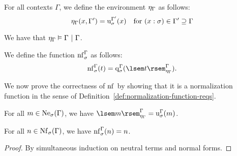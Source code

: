 \begin{comment}
Note the condition "$x$ fresh" in the second case of $\quotef$. This is obviously not a well-defined condition from a mathematical perspective. Rather, it aims to provide computational intuition: when computing the result of $\quotef$ at a function type, we generate a fresh variable name in order avoid capturing the other free variables in the term returned by the recursive call. It is not too difficult to avoid this ambiguity by slightly modifying the interpretation, allowing us to control which variables may occur free in terms.
\end{comment}


\begin{defn} \label{def:idenv}
For all contexts $\Gamma$, we define the environment $\eta_{\Gamma}$ as follows:
\[ \eta_{\Gamma}(x, \Gamma') = \mathrm{u}^{\Gamma'}_{\sigma}(x)
    \quad \text{for } (x : \sigma) \in \Gamma' \supseteq \Gamma \]
\end{defn}

We have that $\eta_{\Gamma} \vDash \Gamma \ |\  \Gamma$.

\begin{defn} \label{def:normalization-function}
We define the function $\mathrm{nf}^{\Gamma}_{\sigma}$ as follows:
\[ \normf{\Gamma}{\sigma}(t) = \quotef{\Gamma}{\sigma}(\ksint{t}{\idenv{\Gamma}}{\Gamma}). \]
\end{defn}

We now prove the correctness of $\mathrm{nf}^{}_{}$ by showing that it is a normalization function in the sense of Definition~\ref{def:normalization-function-reqs}.

\begin{comment}
add more lemmas, possibly:
- naturality of quote/unquote
- compatibility of \eta (i.e. \eta_{\extfresh{\Gamma}{\sigma}} = \kupdenv{\eta_\Gamma}{\fresh{\Gamma}{\sigma}}{\unquotef{\sigma}(\fresh{\Gamma}{\sigma})}
\end{comment}

\begin{lem} \label{lem:norm-idempotent-nf}
\hfill \vspace{-6pt}
\begin{enum}
\item For all $m \in \mathrm{Ne}_{\sigma}(\Gamma)$, we have $\ksint{m}{\idenv{\Gamma}}{\Gamma} = \unquotef{\Gamma}{\sigma}(m)$.
\item For all $n \in \mathrm{Nf}_{\sigma}(\Gamma)$, we have $\mathrm{nf}^{\Gamma}_{\sigma}(n) = n$.
\end{enum}
\begin{proof}
By simultaneous induction on neutral terms and normal forms.
\end{proof}
\end{lem}

